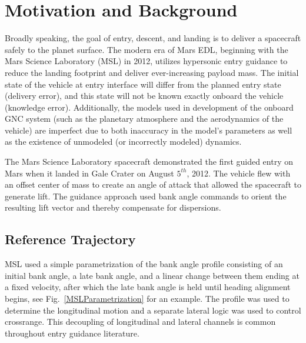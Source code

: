 \documentclass[10pt,a4paper]{article}
\begin{document}
	\section{Motivation and Background}

	Broadly speaking, the goal of entry, descent, and landing is to deliver a spacecraft safely to the planet surface. The modern era of Mars EDL, beginning with the Mars Science Laboratory (MSL) in 2012, utilizes hypersonic entry guidance to reduce the landing footprint and deliver ever-increasing payload mass. The initial state of the vehicle at entry interface will differ from the planned entry state (delivery error), and this state will not be known exactly onboard the vehicle (knowledge error). Additionally, the models used in development of the onboard GNC system (such as the planetary atmosphere and the aerodynamics of the vehicle) are imperfect due to both inaccuracy in the model's parameters as well as the existence of unmodeled (or incorrectly modeled) dynamics.
	
	The Mars Science Laboratory spacecraft demonstrated the first guided entry on Mars when it landed in Gale Crater on August $5^{th}$, 2012. The vehicle flew with an offset center of mass to create an angle of attack that allowed the spacecraft to generate lift. The guidance approach used bank angle commands to orient the resulting lift vector and thereby compensate for dispersions.\cite{MSL_EDL_Overview_JPL}
	
	\subsection{Reference Trajectory}
	MSL used a simple parametrization of the bank angle profile consisting of an initial bank angle, a late bank angle, and a linear change between them ending at a fixed velocity, after which the late bank angle is held until heading alignment begins, see Fig.~\ref{MSLParametrization} for an example. The profile was used to determine the longitudinal motion and a separate lateral logic was used to control crossrange. This decoupling of longitudinal and lateral channels is common throughout entry guidance literature.
	
\end{document}
